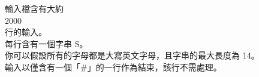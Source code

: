 輸入檔含有大約\\
2000\\
行的輸入。\\
每行含有一個字串 S。\\
你可以假設所有的字母都是大寫英文字母，且字串的最大長度為 14。\\
輸入以僅含有一個「#」的一行作為結束，該行不需處理。\\

